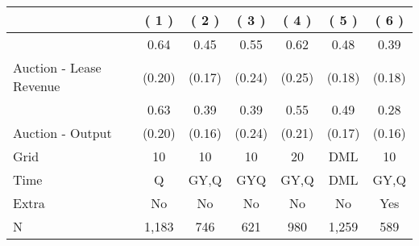 
\begin{tabular}{lcccccc}
\toprule
  & ( 1 ) & ( 2 ) & ( 3 ) & ( 4 ) & ( 5 ) & ( 6 )\\
\midrule
 & 0.64 & 0.45 & 0.55 & 0.62 & 0.48 & 0.39\\

\multirow{-2}{*}{\raggedright\arraybackslash Auction - Lease Revenue} & (0.20) & (0.17) & (0.24) & (0.25) & (0.18) & (0.18)\\

\midrule
 & 0.63 & 0.39 & 0.39 & 0.55 & 0.49 & 0.28\\

\multirow{-2}{*}{\raggedright\arraybackslash Auction - Output} & (0.20) & (0.16) & (0.24) & (0.21) & (0.17) & (0.16)\\

\midrule
Grid & 10 & 10 & 10 & 20 & DML & 10\\

Time & Q & GY,Q & GYQ & GY,Q & DML & GY,Q\\

Extra & No & No & No & No & No & Yes\\

N & 1,183 & 746 & 621 & 980 & 1,259 & 589\\
\bottomrule
\end{tabular}
